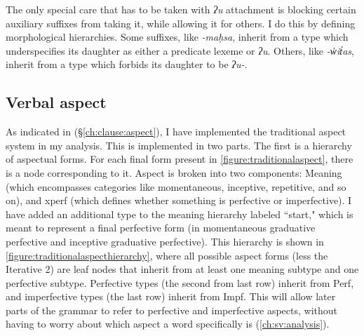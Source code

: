 The only special care that has to be taken with \textit{ʔu} attachment is blocking certain auxiliary suffixes from taking it, while allowing it for others. I do this by defining morphological hierarchies. Some suffixes, like \textit{-maḥsa}, inherit from a type which underspecifies its daughter as either a predicate lexeme or \textit{ʔu}. Others, like \textit{-w̓it̓as}, inherit from a type which forbids its daughter to be \textit{ʔu-}.

\subsection{Verbal aspect} \label{ch:clause:analysis:aspect}

As indicated in (\S\ref{ch:clause:aspect}), I have implemented the traditional aspect system in my analysis. This is implemented in two parts. The first is a hierarchy of aspectual forms. For each final form present in \cref{figure:traditionalaspect}, there is a node corresponding to it. Aspect is broken into two components: Meaning (which encompasses categories like momentaneous, inceptive, repetitive, and so on), and xperf (which defines whether something is perfective or imperfective). I have added an additional type to the meaning hierarchy labeled ``start," which is meant to represent a final perfective form (in momentaneous graduative perfective and inceptive graduative perfective). This hierarchy is shown in \cref{figure:traditionalaspecthierarchy}, where all possible aspect forms (less the Iterative 2) are leaf nodes that inherit from at least one meaning subtype and one perfective subtype. Perfective types (the second from last row) inherit from Perf, and imperfective types (the last row) inherit from Impf. This will allow later parts of the grammar to refer to perfective and imperfective aspects, without having to worry about which aspect a word specifically is (\ref{ch:sv:analysis}).



